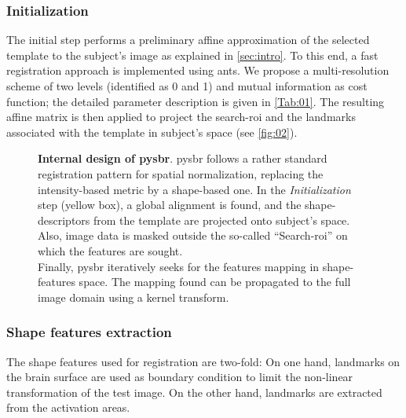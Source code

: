 \documentclass{frontiers}
\newcommand{\insertgraphic}[2]{}
\newcommand{\insertgraphic}[2]{\texttt{[image: \#2]}}
\begin{document}
\subsubsection{Initialization}
\label{sec:meth_initialization}
The initial step performs a preliminary affine approximation of the selected
  template to the subject's image as explained in \autoref{sec:intro}.
To this end, a fast registration approach is implemented using \gls*{ants}.
We propose a multi-resolution scheme of two levels (identified as 0 and 1) and 
  mutual information as cost function; the detailed parameter description 
  is given in \autoref{Tab:01}.
The resulting affine matrix is then applied to project the search-\gls*{roi}
  and the landmarks associated with the template in
  subject's space (see \autoref{fig:02}).

\begin{figure*}[!ht]
\centering
  \begin{subfigure}[bt]{0.65\textwidth}
    \insertgraphic{width=\linewidth}{figures/02-RegistrationFlowDiagram}
  \end{subfigure}
  \hfill
  \begin{minipage}[bt]{0.30\textwidth}
  \caption{\label{fig:02}
  \textbf{Internal design of \gls*{pysbr}}. \Gls*{pysbr} follows a rather standard
  registration pattern for spatial normalization, replacing the intensity-based
  metric by a shape-based one. In the \emph{Initialization} step (yellow box),
  a global alignment is found, and the shape-descriptors from the template
  are projected onto subject's space. Also, image data is masked outside the
  so-called ``Search-\gls*{roi}'' on which the features are sought. \\
  Finally, \gls*{pysbr} iteratively seeks for the features mapping in
  shape-features space. The mapping found can be propagated to the full
  image domain using a kernel transform.
  }
  \end{minipage}
\end{figure*}


\subsubsection{Shape features extraction}
\label{sec:shape_features}

The shape features used for registration are two-fold:
On one hand, landmarks on the brain surface are used as boundary condition to limit the non-linear 
  transformation of the test image. 
On the other hand, landmarks are extracted from the activation areas. 
\end{document}
